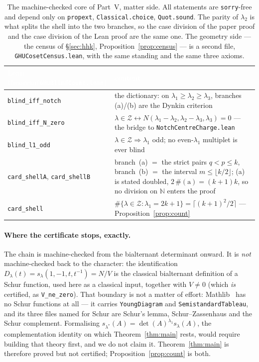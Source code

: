 \documentclass[11pt,a4paper]{article}
\begin{document}
\begin{table}[t]
\centering\small
\begin{tabular}{p{5.6cm}p{8.5cm}}
\toprule
\rowcolor{hdrblue}
\textcolor{white}{Lean theorem}\newline\textcolor{white}{(\texttt{GHUBlindCount.lean})} &
\textcolor{white}{content}\\
\midrule
\texttt{blind\_iff\_notch} &
the dictionary: on $\lambda_1\ge\lambda_2\ge\lambda_3$, branches (a)/(b) are the Dynkin criterion\\
\midrule
\rowcolor{softgrey}
\texttt{blind\_iff\_N\_zero} &
$\lambda\in\mathcal Z\leftrightarrow N(\lambda_1{-}\lambda_2,\lambda_2{-}\lambda_3,\lambda_3)=0$
--- the bridge to \texttt{NotchCentreCharge.lean}\\
\midrule
\texttt{blind\_l1\_odd} &
$\lambda\in\mathcal Z\Rightarrow\lambda_1$ odd; no even-$\lambda_1$ multiplet is ever blind\\
\midrule
\rowcolor{softgrey}
\texttt{card\_shellA}, \texttt{card\_shellB} &
branch~(a) $=$ the strict pairs $q<p\le k$, branch~(b) $=$ the interval $m\le\lfloor k/2\rfloor$;
(a) is stated doubled, $2\,\#(\mathrm a)=(k{+}1)k$, so no division on $\mathbb N$ enters the proof\\
\midrule
\texttt{card\_shell} &
$\#\{\lambda\in\mathcal Z:\lambda_1=2k{+}1\}=\lceil(k+1)^2/2\rceil$ --- Proposition~\ref{prop:count}\\
\bottomrule
\end{tabular}
\caption{The machine-checked core of Part~V, matter side. All statements are \texttt{sorry}-free and
depend only on \texttt{propext}, \texttt{Classical.choice}, \texttt{Quot.sound}. The parity of
$\lambda_2$ is what splits the shell into the two branches, so the case division of the paper proof
and the case division of the Lean proof are the same one. The geometry side --- the census of
\S\ref{sec:hhk}, Proposition~\ref{prop:census} --- is a second file,
\texttt{GHUCosetCensus.lean}, with the same standing and the same three axioms.}
\label{tab:leanV}
\end{table}

\paragraph{Where the certificate stops, exactly.} The chain is machine-checked from the bialternant
determinant onward. It is \emph{not} machine-checked back to the character: the identification
$D_\lambda(t)=s_\lambda(1,-1,t,t^{-1})=N/V$ is the classical bialternant definition of a Schur
function, used here as a classical input, together with $V\ne0$ (which \emph{is} certified, as
\texttt{V\_ne\_zero}). That boundary is not a matter of effort: Mathlib~\cite{Mathlib} has no Schur
functions at all --- it carries \texttt{YoungDiagram} and \texttt{SemistandardTableau}, and its three
files named for Schur are Schur's lemma, Schur--Zassenhaus and the Schur complement. Formalising
$s_{\lambda^*}(A)=\det(A)^{\lambda_1}s_\lambda(A)$, the complementation identity on which
Theorem~\ref{thm:main} rests, would require building that theory first, and we do not claim it.
Theorem~\ref{thm:main} is therefore proved but not certified; Proposition~\ref{prop:count} is both.
\end{document}
